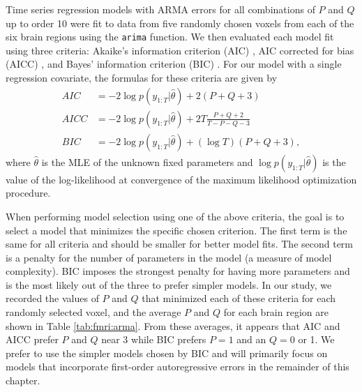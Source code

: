 Time series regression models with ARMA errors for all combinations of $P$ and $Q$ up to order 10 were fit to data from five randomly chosen voxels from each of the six brain regions using the {\tt arima} function. We then evaluated each model fit using three criteria: Akaike's information criterion (AIC) \citep{sak:ish:kit:aic:1986}, AIC corrected for bias (AICC) \citep{sug:aicc:1978,hurv:tsai:aicc:1989}, and Bayes' information criterion (BIC) \citep{schwarz:bic:1978}. For our model with a single regression covariate, the formulas for these criteria are given by
\begin{align}
AIC &= -2\log p(y_{1:T}|\hat{\theta}) + 2(P+Q+3) \label{eqn:aic} \\
AICC &= -2\log p(y_{1:T}|\hat{\theta}) + 2T\frac{P+Q+2}{T-P-Q-3} \label{eqn:aicc} \\
BIC &= -2\log p(y_{1:T}|\hat{\theta}) + (\log T)(P+Q+3), \label{eqn:bic}
\end{align}
where $\hat{\theta}$ is the MLE of the unknown fixed parameters and $\log p(y_{1:T}|\hat{\theta})$ is the value of the log-likelihood at convergence of the maximum likelihood optimization procedure.

When performing model selection using one of the above criteria, the goal is to select a model that minimizes the specific chosen criterion. The first term is the same for all criteria and should be smaller for better model fits. The second term is a penalty for the number of parameters in the model (a measure of model complexity). BIC imposes the strongest penalty for having more parameters and is the most likely out of the three to prefer simpler models. In our study, we recorded the values of $P$ and $Q$ that minimized each of these criteria for each randomly selected voxel, and the average $P$ and $Q$ for each brain region are shown in Table \ref{tab:fmri:arma}. From these averages, it appears that AIC and AICC prefer $P$ and $Q$ near 3 while BIC prefers $P = 1$ and an $Q = 0$ or 1. We prefer to use the simpler models chosen by BIC and will primarily focus on models that incorporate first-order autoregressive errors in the remainder of this chapter.

